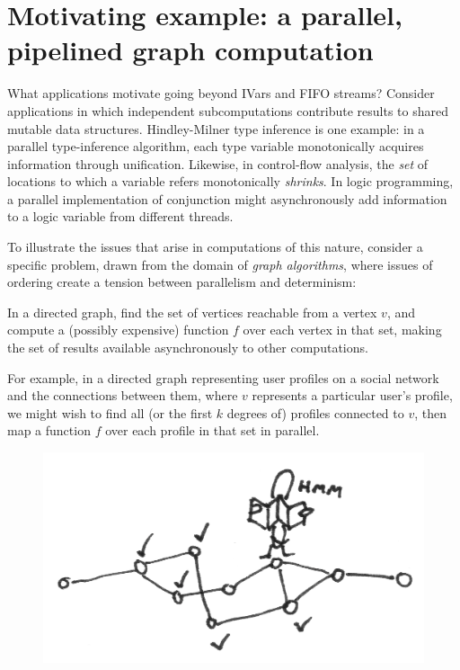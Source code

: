 \section{Motivating example: a parallel, pipelined graph computation}\label{s:lvars-motivation}

What applications motivate going beyond IVars and FIFO streams?
Consider applications in which independent subcomputations contribute
results to shared mutable data structures.  
Hindley-Milner type inference is one example: in a
parallel type-inference algorithm, each type variable monotonically
acquires information through unification.
Likewise, in control-flow analysis, the \emph{set} of
locations to which a variable refers monotonically \emph{shrinks}.  In
logic programming, a parallel implementation of conjunction might
asynchronously add information to a logic variable from different
threads.

To illustrate the issues that arise in computations of this nature,
consider a specific problem, drawn from the domain of \emph{graph
  algorithms}, where issues of ordering create a tension between
parallelism and determinism:
\begin{blockquote}
  In a directed graph, find the set of vertices reachable from a
  vertex $v$, and compute a (possibly expensive) function $f$ over
  each vertex in that set, making the set of results available
  asynchronously to other computations.
\end{blockquote}
\noindent For example, in a directed graph representing user profiles on a
social network and the connections between them, where $v$ represents
a particular user's profile, we might wish to find all (or the first $k$
degrees of) profiles connected to $v$, then map a function $f$ over
each profile in that set in parallel.

\ifdefined\DISSERTATION
\begin{figure}
\vspace{-1em}
\begin{center}
  \includegraphics[scale=0.15]{../illustrations/graph-traversal}
\end{center}
\vspace{-1em}
\end{figure}
\fi

